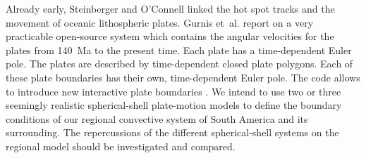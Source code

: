 \documentclass[twoside,10pt]{article}
\begin{document}
Already early, Steinberger and O'Connell \cite{Steinberger1998} linked the hot spot tracks and the movement of oceanic lithospheric plates.
Gurnis et~al. \cite{Gurnis2011} report on a very practicable open-source system which contains the angular velocities for the plates from 140~Ma to the present time. 
Each plate has a time-dependent Euler pole. 
The plates are described by time-dependent closed plate polygons. 
Each of these plate boundaries has their own, time-dependent Euler pole.
The code allows to introduce new interactive plate boundaries \cite{Boyden2011}.
We intend to use two or three seemingly realistic spherical-shell plate-motion models to define the boundary conditions of our regional convective system of South America and its surrounding. 
The repercussions of the different spherical-shell systems on the regional model should be investigated and compared.

\vspace{-2.5ex}
\end{document}

